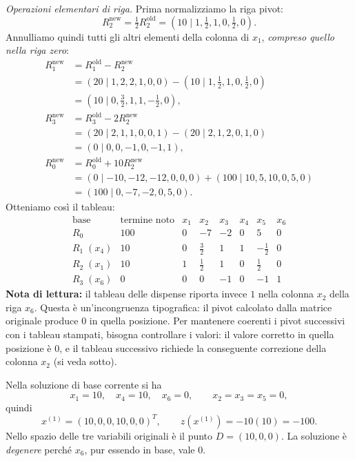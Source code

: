 \emph{Operazioni elementari di riga.} Prima normalizziamo la riga pivot:
\[
R_2^{\mathrm{new}}=\tfrac12R_2^{\mathrm{old}}
=\left(10\mid1,\tfrac12,1,0,\tfrac12,0\right).
\]
Annulliamo quindi tutti gli altri elementi della colonna di $x_1$, \emph{compreso quello nella riga zero}:
\[
\begin{aligned}
R_1^{\mathrm{new}}&=R_1^{\mathrm{old}}-R_2^{\mathrm{new}}\\
 &=\left(20\mid1,2,2,1,0,0\right)
 -\left(10\mid1,\tfrac12,1,0,\tfrac12,0\right)\\
 &=\left(10\mid0,\tfrac32,1,1,-\tfrac12,0\right),\\[3pt]
R_3^{\mathrm{new}}&=R_3^{\mathrm{old}}-2R_2^{\mathrm{new}}\\
 &=\left(20\mid2,1,1,0,0,1\right)
 -\left(20\mid2,1,2,0,1,0\right)\\
 &=\left(0\mid0,0,-1,0,-1,1\right),\\[3pt]
R_0^{\mathrm{new}}&=R_0^{\mathrm{old}}+10R_2^{\mathrm{new}}\\
 &=\left(0\mid-10,-12,-12,0,0,0\right)
 +\left(100\mid10,5,10,0,5,0\right)\\
 &=\left(100\mid0,-7,-2,0,5,0\right).
\end{aligned}
\]
Otteniamo cos\`i il tableau:
\[
\begin{array}{c|r|rrrrrr}
\text{base}&\text{termine noto}&x_1&x_2&x_3&x_4&x_5&x_6\\\hline
R_0&100&0&-7&-2&0&5&0\\\hline
R_1\;(x_4)&10&0&\tfrac32&\boxed{1}&1&-\tfrac12&0\\
R_2\;(x_1)&10&1&\tfrac12&1&0&\tfrac12&0\\
R_3\;(x_6)&0&0&0&-1&0&-1&1
\end{array}
\]
\textbf{Nota di lettura:} il tableau delle dispense riporta invece $1$ nella colonna $x_2$ della riga $x_6$. Questa \`e un'incongruenza tipografica: il pivot calcolato dalla matrice originale produce $0$ in quella posizione. Per mantenere coerenti i pivot successivi con i tableau stampati, bisogna controllare i valori: il valore corretto in quella posizione \`e $0$, e il tableau successivo richiede la conseguente correzione della colonna $x_2$ (si veda sotto).

Nella soluzione di base corrente si ha
\[
x_1=10,\quad x_4=10,\quad x_6=0,\qquad
x_2=x_3=x_5=0,
\]
quindi
\[
x^{(1)}=(10,0,0,10,0,0)^T,\qquad z(x^{(1)})=-10(10)=-100.
\]
Nello spazio delle tre variabili originali \`e il punto $D=(10,0,0)$. La soluzione \`e \emph{degenere} perch\'e $x_6$, pur essendo in base, vale $0$.

